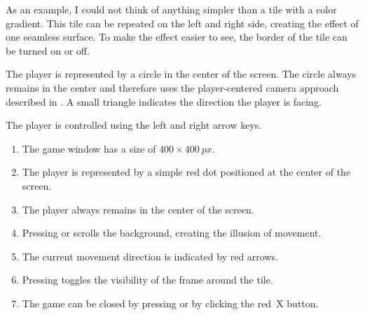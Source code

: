 \begin{figure}%
	\begin{center}%
		\vspace{-2.5em}%
	\end{center}%
\end{figure}%
As an example, I could not think of anything simpler than a tile with a color gradient. This tile can be repeated on the left and right side, creating the effect of one seamless surface. To make the effect easier to see, the border of the tile can be turned on or off.

The player is represented by a circle in the center of the screen. The circle always remains in the center and therefore uses the player-centered camera approach described in . A small triangle indicates the direction the player is facing.

The player is controlled using the left and right arrow keys.


\begin{enumerate}
	\item The game window has a size of $400\times \SI{400}{px}$. \label{reqEndlessStartSize}
	
	\item The player is represented by a simple red dot positioned at the center of the screen. \label{reqEndlessStartPlayer}
	
	\item The player always remains in the center of the screen. \label{reqEndlessStartCentered}
	
	\item Pressing \keys{\arrowkeyleft} or \keys{\arrowkeyright} scrolls the background, creating the illusion of movement. \label{reqEndlessStartDirection}
	
	\item The current movement direction is indicated by red arrows. \label{reqEndlessStartArrows}
	
	\item Pressing  toggles the visibility of the frame around the tile. \label{reqEndlessStartFrame}
	
	\item The game can be closed by pressing \keys{\esc} or by clicking the red~X button. \label{reqEndlessStartQuit}
\end{enumerate}
\er

